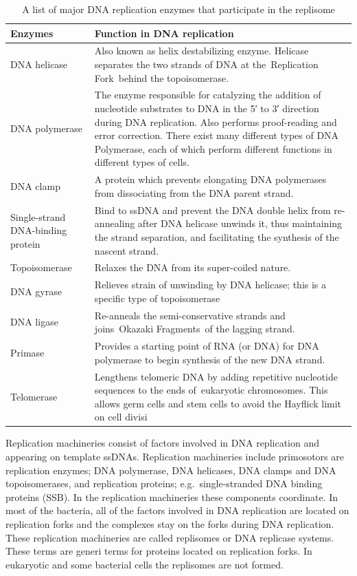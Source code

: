 \begin{longtable}[t]{>{\raggedright\arraybackslash}p{10em}>{\raggedright\arraybackslash}p{30em}}
\caption{\label{tab:heteroploidy}A list of major DNA replication enzymes that participate in the replisome}\\
\toprule
Enzymes & Function in DNA replication\\
\midrule
\rowcolor{gray!6}  DNA helicase & Also known as helix destabilizing enzyme. Helicase separates the two strands of DNA at the Replication Fork behind the topoisomerase.\\
DNA polymerase & The enzyme responsible for catalyzing the addition of nucleotide substrates to DNA in the 5′ to 3′ direction during DNA replication. Also performs proof-reading and error correction. There exist many different types of DNA Polymerase, each of which perform different functions in different types of cells.\\
\rowcolor{gray!6}  DNA clamp & A protein which prevents elongating DNA polymerases from dissociating from the DNA parent strand.\\
Single-strand DNA-binding protein & Bind to ssDNA and prevent the DNA double helix from re-annealing after DNA helicase unwinds it, thus maintaining the strand separation, and facilitating the synthesis of the nascent strand.\\
\rowcolor{gray!6}  Topoisomerase & Relaxes the DNA from its super-coiled nature.\\
\addlinespace
DNA gyrase & Relieves strain of unwinding by DNA helicase; this is a specific type of topoisomerase\\
\rowcolor{gray!6}  DNA ligase & Re-anneals the semi-conservative strands and joins Okazaki Fragments of the lagging strand.\\
Primase & Provides a starting point of RNA (or DNA) for DNA polymerase to begin synthesis of the new DNA strand.\\
\rowcolor{gray!6}  Telomerase & Lengthens telomeric DNA by adding repetitive nucleotide sequences to the ends of eukaryotic chromosomes. This allows germ cells and stem cells to avoid the Hayflick limit on cell divisi\\
\bottomrule
\end{longtable}

Replication machineries consist of factors involved in DNA replication and appearing on template ssDNAs. Replication machineries include primosotors are replication enzymes; DNA polymerase, DNA helicases, DNA clamps and DNA topoisomerases, and replication proteins; e.g.~single-stranded DNA binding proteins (SSB). In the replication machineries these components coordinate. In most of the bacteria, all of the factors involved in DNA replication are located on replication forks and the complexes stay on the forks during DNA replication. These replication machineries are called replisomes or DNA replicase systems. These terms are generi terms for proteins located on replication forks. In eukaryotic and some bacterial cells the replisomes are not formed.

